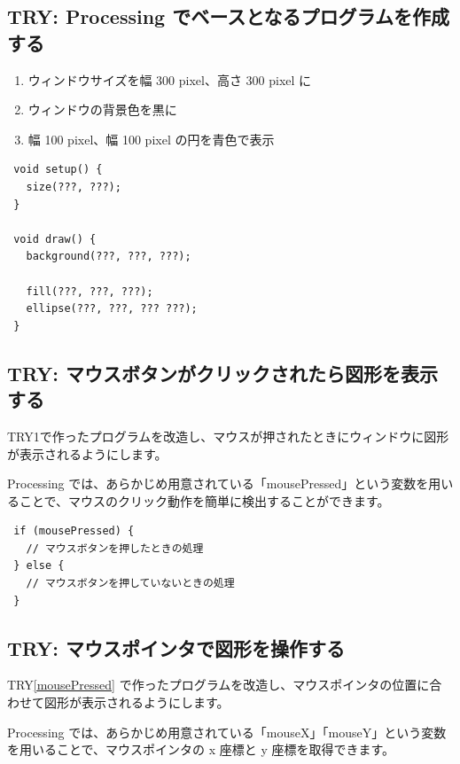\documentclass[11pt,a4paper]{jarticle}
\begin{document}
\setcounter{nombre}{1}
\subsection*{TRY\thenombre: Processing でベースとなるプログラムを作成する}
\label{Base}

\begin{enumerate}
 \item ウィンドウサイズを幅 300 pixel、高さ 300 pixel に
 \item ウィンドウの背景色を黒に
 \item 幅 100 pixel、幅 100 pixel の円を青色で表示
\end{enumerate}

\begin{lstlisting}
 void setup() {
   size(???, ???);
 }

 void draw() {
   background(???, ???, ???);

   fill(???, ???, ???);
   ellipse(???, ???, ??? ???);
 }
\end{lstlisting}

\subsection*{TRY\thenombre: マウスボタンがクリックされたら図形を表示する}
\label{mousePressed}

TRY1で作ったプログラムを改造し、マウスが押されたときにウィンドウに図形が表示されるようにします。

Processing では、あらかじめ用意されている「mousePressed」という変数を用いることで、マウスのクリック動作を簡単に検出することができます。
\begin{lstlisting}
 if (mousePressed) {
   // マウスボタンを押したときの処理
 } else {
   // マウスボタンを押していないときの処理
 }
\end{lstlisting}


\subsection*{TRY\thenombre: マウスポインタで図形を操作する}

TRY\ref{mousePressed} で作ったプログラムを改造し、マウスポインタの位置に合わせて図形が表示されるようにします。

Processing では、あらかじめ用意されている「mouseX」「mouseY」という変数を用いることで、マウスポインタの x 座標と y 座標を取得できます。
\end{document}
